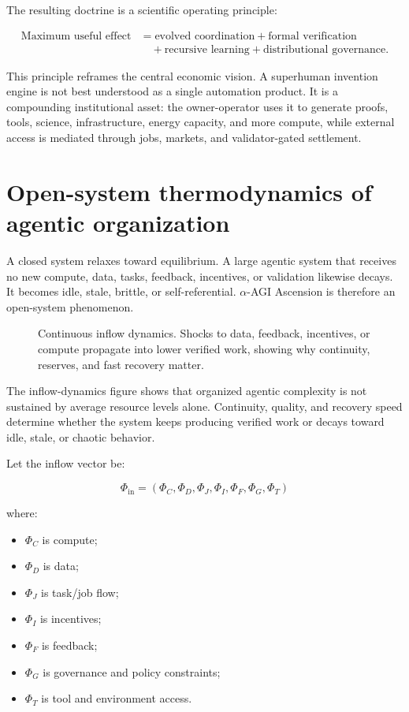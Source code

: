 \documentclass[
  11pt,
]{article}
\providecommand{\tightlist}{%
  \setlength{\itemsep}{0pt}\setlength{\parskip}{0pt}}
\begin{document}
The resulting doctrine is a scientific operating principle:

\[
\boxed{
\begin{aligned}
\text{Maximum useful effect}
&= \text{evolved coordination}+\text{formal verification}\\
&\quad +\text{recursive learning}+\text{distributional governance}.
\end{aligned}
}
\]

This principle reframes the central economic vision. A superhuman invention engine is not best understood as a single automation product. It is a compounding institutional asset: the owner-operator uses it to generate proofs, tools, science, infrastructure, energy capacity, and more compute, while external access is mediated through jobs, markets, and validator-gated settlement.


\section{Open-system thermodynamics of agentic
organization}\label{open-system-thermodynamics-of-agentic-organization}

A closed system relaxes toward equilibrium. A large agentic system that
receives no new compute, data, tasks, feedback, incentives, or
validation likewise decays. It becomes idle, stale, brittle, or
self-referential. $\alpha$-AGI Ascension is therefore an open-system
phenomenon.

\begin{figure}
\centering
\resizebox{0.94\textwidth}{!}{}
\caption{Continuous inflow dynamics. Shocks to data, feedback,
incentives, or compute propagate into lower verified work, showing why
continuity, reserves, and fast recovery matter.}
\end{figure}

The inflow-dynamics figure shows that organized agentic complexity is not sustained by
average resource levels alone. Continuity, quality, and recovery speed
determine whether the system keeps producing verified work or decays
toward idle, stale, or chaotic behavior.

Let the inflow vector be:

\[
\Phi_{\text{in}} =
(\Phi_C,\Phi_D,\Phi_J,\Phi_I,\Phi_F,\Phi_G,\Phi_T)
\]

where:

\begin{itemize}
\tightlist
\item
  \(\Phi_C\) is compute;
\item
  \(\Phi_D\) is data;
\item
  \(\Phi_J\) is task/job flow;
\item
  \(\Phi_I\) is incentives;
\item
  \(\Phi_F\) is feedback;
\item
  \(\Phi_G\) is governance and policy constraints;
\item
  \(\Phi_T\) is tool and environment access.
\end{itemize}
\end{document}
